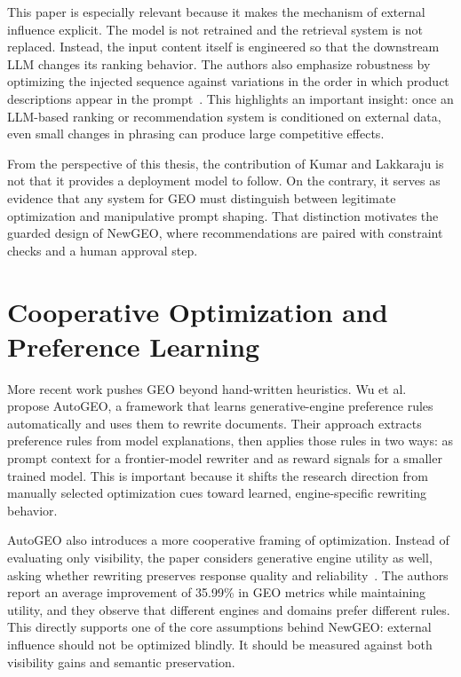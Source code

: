 This paper is especially relevant because it makes the mechanism of external influence explicit.
The model is not retrained and the retrieval system is not replaced. Instead, the input content
itself is engineered so that the downstream LLM changes its ranking behavior. The authors
also emphasize robustness by optimizing the injected sequence against variations in the order in
which product descriptions appear in the prompt~\cite{kumar2024manipulating}. This
highlights an important insight: once an LLM-based ranking or recommendation system is
conditioned on external data, even small changes in phrasing can produce large competitive
effects.

From the perspective of this thesis, the contribution of Kumar and Lakkaraju is not that it
provides a deployment model to follow. On the contrary, it serves as evidence that any system
for GEO must distinguish between legitimate optimization and manipulative prompt shaping.
That distinction motivates the guarded design of NewGEO, where recommendations are paired
with constraint checks and a human approval step.

\section{Cooperative Optimization and Preference Learning}

More recent work pushes GEO beyond hand-written heuristics. Wu et al.~\cite{wu2025autogeo}
propose AutoGEO, a framework that learns generative-engine preference rules automatically
and uses them to rewrite documents. Their approach extracts preference rules from model
explanations, then applies those rules in two ways: as prompt context for a frontier-model
rewriter and as reward signals for a smaller trained model. This is important because it shifts
the research direction from manually selected optimization cues toward learned, engine-specific
rewriting behavior.

AutoGEO also introduces a more cooperative framing of optimization. Instead of evaluating
only visibility, the paper considers generative engine utility as well, asking whether rewriting
preserves response quality and reliability~\cite{wu2025autogeo}. The authors report an average
improvement of 35.99\% in GEO metrics while maintaining utility, and they observe that
different engines and domains prefer different rules. This directly supports one of the core
assumptions behind NewGEO: external influence should not be optimized blindly. It should be
measured against both visibility gains and semantic preservation.

